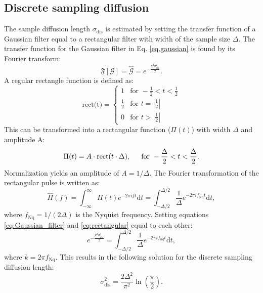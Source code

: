 \documentclass[11pt, draftcls, onecolumn]{IEEEtran} %
\numberwithin{equation}{section}
\numberwithin{table}{section}
\numberwithin{figure}{section}
\begin{document}
\begin{appendices}
\section{Discrete sampling diffusion} \label{sec:appendix_sampling_diffusion}
The sample diffusion length $\sigma_{\mathrm{dis}}$ is estimated by setting the transfer function of a Gaussian filter 
equal to a rectangular filter with width of the sample size $\Delta$.
The transfer function for the Gaussian filter in Eq. \ref{eq.gaussian} is found by its Fourier transform:
\begin{equation} \label{eq:Gaussian_filter}
\mathfrak{F}\left[\mathcal{G}\right] = \hat{\mathcal{G}} = e^{-\frac{k^2 \sigma^2_{\mathrm{dis}}}{2}}.    
\end{equation}
A regular rectangle function is defined as:
\begin{equation}
\text{rect(t)}   = \begin{cases} 1 & 	\text{for } -\frac{1}{2} < t < \frac{1}{2} \\
\frac{1}{2} & \text{for }     t = |\frac{1}{2}|   \\
0  & \text{for }     t > |\frac{1}{2}|  %
\end{cases}
\end{equation}
This can be transformed into a rectangular function ($\Pi(t)$) with width $\Delta$ and amplitude A:
\begin{equation}
\Pi(t) = A \cdot \text{rect}(t\cdot\Delta), \indent \text{for } -\frac{\Delta}{2} < t < \frac{\Delta}{2}.
\end{equation}
Normalization yields an amplitude of  $A = 1/\Delta$. The Fourier transformation of the rectangular pulse is written as:
\begin{equation} \label{eq:rectangular}
\hat{\Pi}(f) = \int_{-\infty}^{\infty} \Pi(t) e^{- 2 \pi i f t} \mathrm{d}t = \int_{-\Delta/2}^{\Delta/2} \frac{1}{\Delta} e^{- 2 \pi i f_{\mathrm{Nq}} t} \mathrm{d}t,
\end{equation}
where $f_{\mathrm{Nq}} = 1/(2 \Delta)$ is the Nyquist frequency.
Setting equations \ref{eq:Gaussian_filter} and \ref{eq:rectangular} equal to each other:
\begin{equation}
e^{-\frac{k^2 \sigma^2_{dis}}{2}} =  \int_{-\Delta/2}^{\Delta/2} \frac{1}{\Delta} e^{- 2 \pi i f_{nq} t} \mathrm{d}t,
\end{equation}
where  $k = 2\pi f_{\mathrm{Nq}}$. This results in the following solution for the discrete sampling diffusion length:
\begin{equation}  \label{eq:sample_diff}
\sigma^2_{\mathrm{dis}} = \frac{2\Delta^2}{\pi^2} \ln\left(\frac{\pi}{2}\right).
\end{equation}


\end{appendices}
\end{document}
